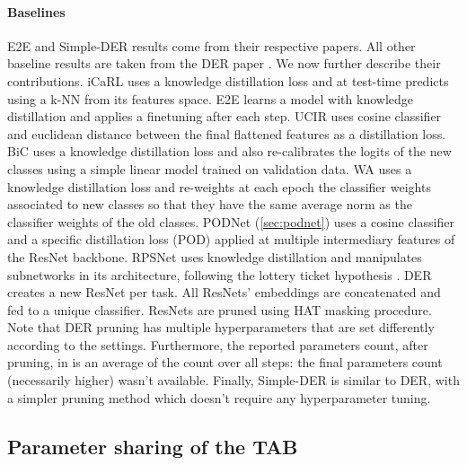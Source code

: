 \paragraph{Baselines} E2E \citep{castro2018end_to_end_inc_learn} and Simple-DER
\citep{li2021preserve} results come from their respective papers. All other baseline results are
taken from the DER paper \citep{yan2021der}. We now further describe their contributions. iCaRL
\citep{rebuffi2017icarl} uses a knowledge distillation loss \citep{hinton2015knowledge_distillation}
and at test-time predicts using a k-NN from its features space. E2E
\citep{castro2018end_to_end_inc_learn} learns a model with knowledge distillation and applies a
finetuning after each step. UCIR \citep{hou2019ucir} uses cosine classifier and euclidean distance
between the final flattened features as a distillation loss. BiC \citep{wu2019bias_correction} uses
a knowledge distillation loss and also re-calibrates \citep{guo2017miscalibration} the logits of the
new classes using a simple linear model trained on validation data. WA
\citep{zhao2020weightalignement} uses a knowledge distillation loss and re-weights at each epoch the
classifier weights associated to new classes so that they have the same average norm as the
classifier weights of the old classes. PODNet (\autoref{sec:podnet}) uses a cosine classifier and a
specific distillation loss (POD) applied at multiple intermediary features of the ResNet backbone.
RPSNet \citep{rajasegaran2019rpsnet} uses knowledge distillation and manipulates subnetworks in its
architecture, following the lottery ticket hypothesis \citep{frankle2019lottery_ticket}. DER
\citep{yan2021der} creates a new ResNet per task. All ResNets' embeddings are concatenated and fed
to a unique classifier. ResNets are pruned using HAT \citep{serra2018hat} masking procedure. Note
that DER pruning has multiple hyperparameters that are set differently according to the settings.
Furthermore, the reported parameters count, after pruning, in \citep{yan2021der} is an average of
the count over all steps: the final parameters count (necessarily higher) wasn't available. Finally,
Simple-DER \citep{li2021preserve} is similar to DER, with a simpler pruning method which doesn't
require any hyperparameter tuning.

%

\subsection{Parameter sharing of the TAB}

